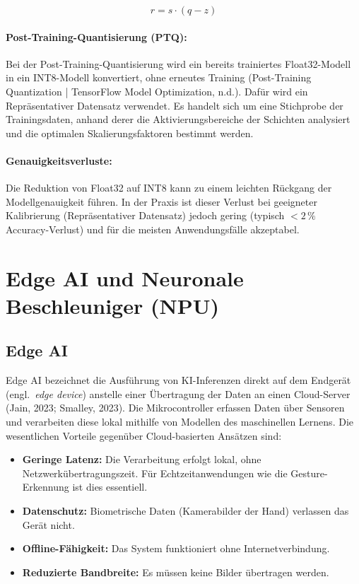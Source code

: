 $$r = s \cdot (q - z)$$

\paragraph{Post-Training-Quantisierung (PTQ):}
Bei der Post-Training-Quantisierung wird ein bereits trainiertes Float32-Modell in ein INT8-Modell konvertiert, ohne erneutes Training (Post-Training Quantization | TensorFlow Model Optimization, n.d.). Dafür wird ein Repräsentativer Datensatz verwendet. Es handelt sich um eine Stichprobe der Trainingsdaten, anhand derer die Aktivierungsbereiche der Schichten analysiert und die optimalen Skalierungsfaktoren bestimmt werden.

\paragraph{Genauigkeitsverluste:}
Die Reduktion von Float32 auf INT8 kann zu einem leichten Rückgang der Modellgenauigkeit führen. In der Praxis ist dieser Verlust bei geeigneter Kalibrierung (Repräsentativer Datensatz) jedoch gering (typisch $< 2\,\%$ Accuracy-Verlust) und für die meisten Anwendungsfälle akzeptabel.

\section{Edge AI und Neuronale Beschleuniger (NPU)}

\subsection{Edge AI}

Edge AI bezeichnet die Ausführung von KI-Inferenzen direkt auf dem Endgerät (engl.\ \textit{edge device}) anstelle einer Übertragung der Daten an einen Cloud-Server (Jain, 2023; Smalley, 2023). Die Mikrocontroller erfassen Daten über Sensoren und verarbeiten diese lokal mithilfe von Modellen des maschinellen Lernens. Die wesentlichen Vorteile gegenüber Cloud-basierten Ansätzen sind:

\begin{itemize}
    \item \textbf{Geringe Latenz:} Die Verarbeitung erfolgt lokal, ohne Netzwerkübertragungszeit. Für Echtzeitanwendungen wie die Gesture-Erkennung ist dies essentiell.
    \item \textbf{Datenschutz:} Biometrische Daten (Kamerabilder der Hand) verlassen das Gerät nicht.
    \item \textbf{Offline-Fähigkeit:} Das System funktioniert ohne Internetverbindung.
    \item \textbf{Reduzierte Bandbreite:} Es müssen keine Bilder übertragen werden.
\end{itemize}

